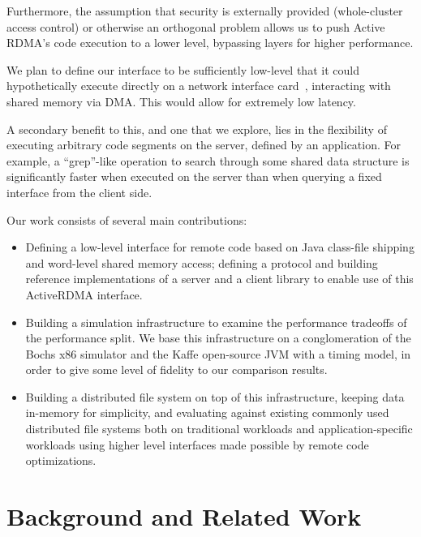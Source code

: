 \documentclass[10pt]{article}
\begin{document}
Furthermore, the assumption that security is externally provided
(whole-cluster access control) or otherwise an orthogonal problem
allows us to push Active RDMA's code execution to a lower level,
bypassing layers for higher performance. 

We plan to define our interface to be sufficiently low-level that
it could hypothetically execute directly on a network interface
card~\cite{nic-basedreduction}, interacting with shared memory via DMA.
This would allow for extremely low latency.

A secondary benefit to this, and one that we explore, lies in the
flexibility of executing arbitrary code segments on the server,
defined by an application. For example, a ``grep''-like operation to
search through some shared data structure is significantly faster when
executed on the server than when querying a fixed interface from the
client side.

Our work consists of several main contributions:

\begin{itemize} \itemsep -2pt

\item Defining a low-level interface for remote code based on Java
  class-file shipping and word-level shared memory access; defining a
  protocol and building reference implementations of a server and a
  client library to enable use of this ActiveRDMA interface.

\item Building a simulation infrastructure to examine the performance
  tradeoffs of the performance split. We base this infrastructure on a
  conglomeration of the Bochs x86 simulator and the Kaffe open-source
  JVM with a timing model, in order to give some level of fidelity to
  our comparison results.

\item Building a distributed file system on top of this infrastructure,
  keeping data in-memory for simplicity, and evaluating against
  existing commonly used distributed file systems both on traditional
  workloads and application-specific workloads using higher level
  interfaces made possible by remote code optimizations.

\end{itemize}

\section{Background and Related Work}
\end{document}
